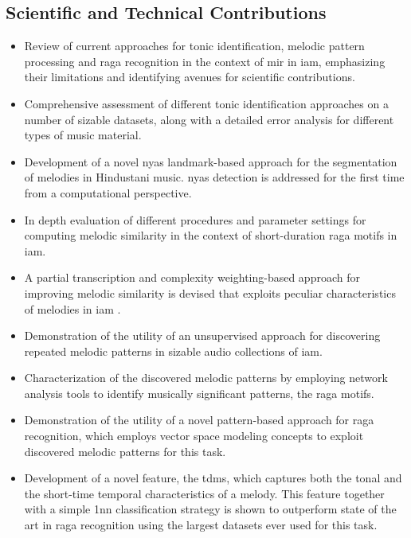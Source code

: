\subsection*{Scientific and Technical Contributions}

\begin{itemize}
	\item Review of current approaches for tonic identification, melodic pattern processing and \gls{raga} recognition in the context of \gls{mir} in \gls{iam}, emphasizing their limitations and identifying avenues for scientific contributions.
	\item Comprehensive assessment of different tonic identification approaches on a number of sizable datasets,  along with a detailed error analysis for different types of music material.
	\item Development of a novel \gls{nyas} landmark-based approach for the segmentation of melodies in Hindustani music. \Gls{nyas} detection is addressed for the first time from a computational perspective.
	\item In depth evaluation of different procedures and parameter settings for computing melodic similarity in the context of short-duration \gls{raga} motifs in \gls{iam}. 
	\item A partial transcription and complexity weighting-based approach for improving melodic similarity is devised that exploits peculiar characteristics of melodies in \gls{iam} .
	\item Demonstration of the utility of an unsupervised approach for discovering repeated melodic patterns in sizable audio collections of \gls{iam}.
	\item Characterization of the discovered melodic patterns by employing network analysis tools to identify musically significant patterns, the \gls{raga} motifs. 
	\item Demonstration of the utility of a novel pattern-based approach for \gls{raga} recognition, which employs vector space modeling concepts to exploit discovered melodic patterns for this task. 
	\item Development of  a novel feature, the \acrfull{tdms}, which captures both the tonal and the short-time temporal characteristics of a melody. This feature together with a simple \gls{1nn} classification strategy is shown to outperform state of the art in \gls{raga} recognition using the largest datasets ever used for this task. 
\end{itemize}

